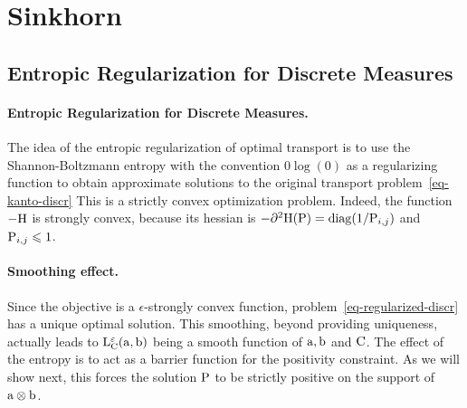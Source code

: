 

\section{Sinkhorn}

\subsection{Entropic Regularization for Discrete Measures}


\paragraph{Entropic Regularization for Discrete Measures.}

The idea of the entropic regularization of optimal transport is to use the Shannon-Boltzmann entropy
with the convention $0 \log(0)$
as a regularizing function to obtain approximate solutions to the original transport problem~\eqref{eq-kanto-discr} 
This is a strictly convex optimization problem. 
%
Indeed, the function $-\HD$ is strongly convex, because its hessian is $-\partial^2 \HD(\P)=\diag(1/\P_{i,j})$ and $\P_{i,j} \leq 1$. 



\paragraph{Smoothing effect.}

Since the objective is a $\epsilon$-strongly convex function, problem~\ref{eq-regularized-discr} has a unique optimal solution. 
%
This smoothing, beyond providing uniqueness, actually leads to $\MKD_\C^\epsilon(\a,\b)$ being a smooth function of $\a, \b$ and $\C$. 
%
The effect of the entropy is to act as a barrier function for the positivity constraint. As we will show next, this forces the solution $\P$ to be strictly positive on the support of $\a \otimes \b$. 

